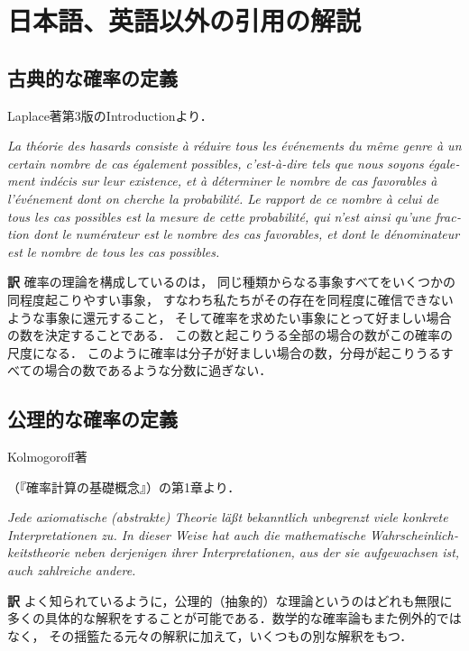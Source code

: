 \documentclass[main.tex]{subfiles}
\begin{document}
\chapter{日本語、英語以外の引用の解説}

\section{古典的な確率の定義}

Laplace著第3版のIntroductionより．

\begin{quotebox}
\begin{french}
{\itshape
La théorie des hasards consiste à réduire tous les événements du même genre à un certain nombre
de cas également possibles, c'est-à-dire tels que nous soyons également indécis sur leur existence,
et à déterminer le nombre de cas favorables à l'événement dont on cherche la probabilité.
Le rapport de ce nombre à celui de tous les cas possibles est la mesure de cette probabilité,
qui n'est ainsi qu'une fraction dont le numérateur est le nombre des cas favorables,
et dont le dénominateur est le nombre de tous les cas possibles.}
\end{french}
\end{quotebox}

\noindent \textbf{\gtfamily 訳} 確率の理論を構成しているのは，
同じ種類からなる事象すべてをいくつかの同程度起こりやすい事象，
すなわち私たちがその存在を同程度に確信できないような事象に還元すること，
そして確率を求めたい事象にとって好ましい場合の数を決定することである．
この数と起こりうる全部の場合の数がこの確率の尺度になる．
このように確率は分子が好ましい場合の数，分母が起こりうるすべての場合の数であるような分数に過ぎない．




\section{公理的な確率の定義}

Kolmogoroff著\begin{german}\end{german}（『確率計算の基礎概念』）の第1章より．

\begin{quotebox}
\begin{german}{\itshape
Jede axiomatische (abstrakte) Theorie läßt
bekanntlich unbegrenzt viele konkrete Interpretationen zu.
In dieser Weise hat auch die mathematische Wahrscheinlichkeitstheorie
neben derjenigen ihrer Interpretationen,
aus der sie aufgewachsen ist,
auch zahlreiche andere.}
\end{german}
\end{quotebox}

\noindent \textbf{\gtfamily 訳} よく知られているように，公理的（抽象的）な理論というのはどれも無限に多くの具体的な解釈をすることが可能である．数学的な確率論もまた例外的ではなく，
その揺籃たる元々の解釈に加えて，いくつもの別な解釈をもつ．


\end{document}

